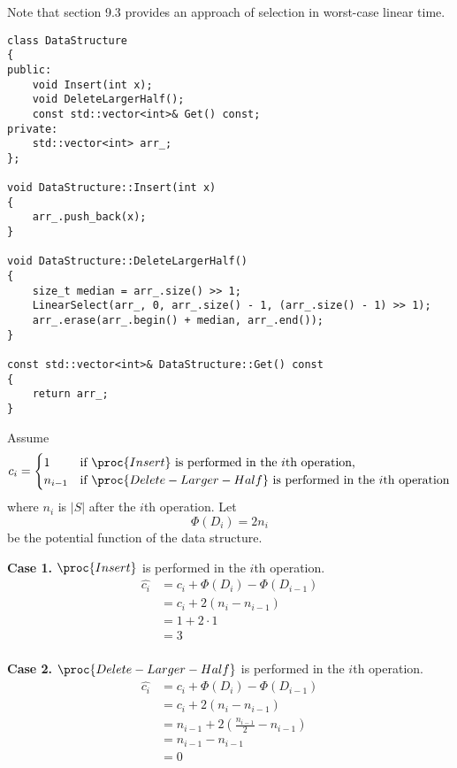 Note that section 9.3 provides an approach of selection in worst-case linear time.

\begin{verbatim}
class DataStructure
{
public:
    void Insert(int x);
    void DeleteLargerHalf();
    const std::vector<int>& Get() const;
private:
    std::vector<int> arr_;
};

void DataStructure::Insert(int x)
{
    arr_.push_back(x);
}

void DataStructure::DeleteLargerHalf()
{
    size_t median = arr_.size() >> 1;
    LinearSelect(arr_, 0, arr_.size() - 1, (arr_.size() - 1) >> 1);
    arr_.erase(arr_.begin() + median, arr_.end());
}

const std::vector<int>& DataStructure::Get() const
{
    return arr_;
}
\end{verbatim}

Assume
\begin{equation*}
    c_i = 
    \begin{cases}
        1 & \text{if $\proc{Insert}$ is performed in the $i$th operation,} \\
        n_{i-1} & \text{if $\proc{Delete-Larger-Half}$ 
            is performed in the $i$th operation} \\
    \end{cases}
\end{equation*}
where $n_i$ is $|S|$ after the $i$th operation.
Let
\begin{equation*}
    \Phi(D_i) = 2n_i
\end{equation*}
be the potential function of the data structure.

\textbf{Case 1.}
$\proc{Insert}$ is performed in the $i$th operation.
\begin{equation*}
\begin{split}
    \hat{c_i} & = c_i + \Phi(D_i) - \Phi(D_{i-1}) \\
    & = c_i+ 2(n_i - n_{i-1}) \\
    & = 1 + 2 \cdot 1 \\
    & = 3 \\
\end{split}
\end{equation*}

\textbf{Case 2.}
$\proc{Delete-Larger-Half}$ is performed in the $i$th operation.
\begin{equation*}
\begin{split}
    \hat{c_i} & = c_i + \Phi(D_i) - \Phi(D_{i-1}) \\
    & = c_i + 2(n_i - n_{i-1}) \\
    & = n_{i-1} + 2(\frac{n_{i-1}}{2} - n_{i-1}) \\
    & = n_{i-1} - n_{i-1} \\
    & = 0 \\
\end{split}
\end{equation*}

